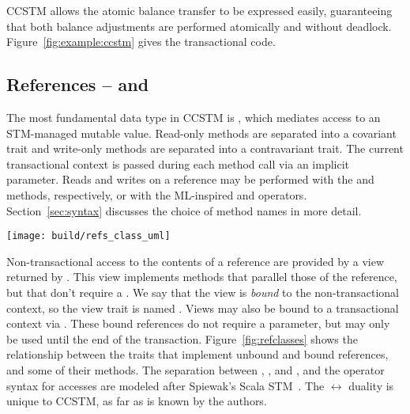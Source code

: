 CCSTM allows the atomic balance transfer to be expressed easily,
guaranteeing that both balance adjustments are performed atomically and
without deadlock.  Figure~\ref{fig:example:ccstm} gives the transactional
code.

\subsection{References --  and }

The most fundamental data type in CCSTM is , which mediates
access to an STM-managed mutable value.  Read-only methods are separated into a
covariant  trait and write-only methods are separated into a
contravariant  trait.  The current transactional context is passed
during
each method call via an implicit parameter.  Reads and writes on a
reference may be performed with the  and  methods,
respectively, or with the ML-inspired  and \code{:=}
operators.  Section~\ref{sec:syntax} discusses
the choice of method names in more detail.

\begin{figure*}
  \centering
  \texttt{[image: build/refs\_class\_uml]}

\caption{Traits that provide access to an STM-managed memory
location.  Transactional access can occur through either 
or a  returned from ,
non-transactional access occurs through a  returned
from .   and 
decompose the covariant and contravariant operations of .}

\label{fig:refclasses}
\end{figure*}

Non-transactional access to the contents of a reference are provided by
a view returned by .  This view implements methods that
parallel those of the reference, but that don't require a .
We say that the view is \textit{bound} to the non-transactional context,
so the view trait is named .  Views may also be bound
to a transactional context via .  These bound
references do not require a  parameter, but may only be used
until the end of the transaction.  Figure~\ref{fig:refclasses} shows the
 relationship between the traits that implement unbound
and bound references, and some of their methods.  The separation between
, , and , and the operator syntax for
accesses are modeled after Spiewak's Scala STM~\cite{github:spiewak}.
The  $ \leftrightarrow $  duality is unique
to CCSTM, as far as is known by the authors.

